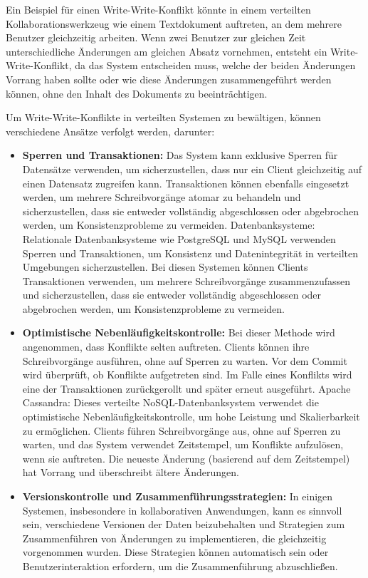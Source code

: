 \documentclass[../vs-script-first-v01.tex]{subfiles}
\begin{document}
Ein Beispiel für einen Write-Write-Konflikt könnte in einem verteilten Kollaborationswerkzeug wie einem Textdokument auftreten, an dem mehrere Benutzer gleichzeitig arbeiten. Wenn zwei Benutzer zur gleichen Zeit unterschiedliche Änderungen am gleichen Absatz vornehmen, entsteht ein Write-Write-Konflikt, da das System entscheiden muss, welche der beiden Änderungen Vorrang haben sollte oder wie diese Änderungen zusammengeführt werden können, ohne den Inhalt des Dokuments zu beeinträchtigen.

Um Write-Write-Konflikte in verteilten Systemen zu bewältigen, können verschiedene Ansätze verfolgt werden, darunter:
\begin{itemize}
\item \textbf{Sperren und Transaktionen:} Das System kann exklusive Sperren für Datensätze verwenden, um sicherzustellen, dass nur ein Client gleichzeitig auf einen Datensatz zugreifen kann. Transaktionen können ebenfalls eingesetzt werden, um mehrere Schreibvorgänge atomar zu behandeln und sicherzustellen, dass sie entweder vollständig abgeschlossen oder abgebrochen werden, um Konsistenzprobleme zu vermeiden.
Datenbanksysteme: Relationale Datenbanksysteme wie PostgreSQL und MySQL verwenden Sperren und Transaktionen, um Konsistenz und Datenintegrität in verteilten Umgebungen sicherzustellen. Bei diesen Systemen können Clients Transaktionen verwenden, um mehrere Schreibvorgänge zusammenzufassen und sicherzustellen, dass sie entweder vollständig abgeschlossen oder abgebrochen werden, um Konsistenzprobleme zu vermeiden.
\item  \textbf{Optimistische Nebenläufigkeitskontrolle:} Bei dieser Methode wird angenommen, dass Konflikte selten auftreten. Clients können ihre Schreibvorgänge ausführen, ohne auf Sperren zu warten. Vor dem Commit wird überprüft, ob Konflikte aufgetreten sind. Im Falle eines Konflikts wird eine der Transaktionen zurückgerollt und später erneut ausgeführt.
Apache Cassandra: Dieses verteilte NoSQL-Datenbanksystem verwendet die optimistische Nebenläufigkeitskontrolle, um hohe Leistung und Skalierbarkeit zu ermöglichen. Clients führen Schreibvorgänge aus, ohne auf Sperren zu warten, und das System verwendet Zeitstempel, um Konflikte aufzulösen, wenn sie auftreten. Die neueste Änderung (basierend auf dem Zeitstempel) hat Vorrang und überschreibt ältere Änderungen.
\item  \textbf{Versionskontrolle und Zusammenführungsstrategien:} In einigen Systemen, insbesondere in kollaborativen Anwendungen, kann es sinnvoll sein, verschiedene Versionen der Daten beizubehalten und Strategien zum Zusammenführen von Änderungen zu implementieren, die gleichzeitig vorgenommen wurden. Diese Strategien können automatisch sein oder Benutzerinteraktion erfordern, um die Zusammenführung abzuschließen.

\end{itemize}
\end{document}
